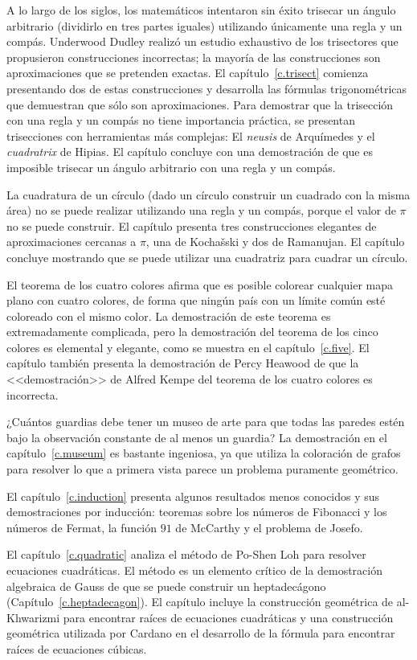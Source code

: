 A lo largo de los siglos, los matemáticos intentaron sin éxito trisecar un ángulo arbitrario (dividirlo en tres partes iguales) utilizando únicamente una regla y un compás. Underwood Dudley realizó un estudio exhaustivo de los trisectores que propusieron construcciones incorrectas; la mayoría de las construcciones son aproximaciones que se pretenden exactas. El capítulo~\ref{c.trisect} comienza presentando dos de estas construcciones y desarrolla las fórmulas trigonométricas que demuestran que sólo son aproximaciones. Para demostrar que la trisección con una regla y un compás no tiene importancia práctica, se presentan trisecciones con herramientas más complejas: El \emph{neusis} de Arquímedes y el \emph{cuadratrix} de Hipias. El capítulo concluye con una demostración de que es imposible trisecar un ángulo arbitrario con una regla y un compás. 

La cuadratura de un círculo (dado un círculo construir un cuadrado con la misma área) no se puede realizar utilizando una regla y un compás, porque el valor de $\pi$ no se puede construir. El capítulo presenta tres construcciones elegantes de aproximaciones cercanas a $\pi$, una de Kochašski y dos de Ramanujan. El capítulo concluye mostrando que se puede utilizar una cuadratriz para cuadrar un círculo.

El teorema de los cuatro colores afirma que es posible colorear cualquier mapa plano con cuatro colores, de forma que ningún país con un límite común esté coloreado con el mismo color. La demostración de este teorema es extremadamente complicada, pero la demostración del teorema de los cinco colores es elemental y elegante, como se muestra en el capítulo~\ref{c.five}. El capítulo también presenta la demostración de Percy Heawood de que la <<demostración>> de Alfred Kempe del teorema de los cuatro colores es incorrecta.

¿Cuántos guardias debe tener un museo de arte para que todas las paredes estén bajo la observación constante de al menos un guardia? La demostración en el capítulo~\ref{c.museum} es bastante ingeniosa, ya que utiliza la coloración de grafos para resolver lo que a primera vista parece un problema puramente geométrico.

El capítulo~\ref{c.induction} presenta algunos resultados menos conocidos y sus demostraciones por inducción: teoremas sobre los números de Fibonacci y los números de Fermat, la función $91$ de McCarthy y el problema de Josefo.

El capítulo~\ref{c.quadratic} analiza el método de Po-Shen Loh para resolver ecuaciones cuadráticas. El método es un elemento crítico de la demostración algebraica de Gauss de que se puede construir un heptadecágono (Capítulo~\ref{c.heptadecagon}). El capítulo incluye la construcción geométrica de al-Khwarizmi para encontrar raíces de ecuaciones cuadráticas y una construcción geométrica utilizada por Cardano en el desarrollo de la fórmula para encontrar raíces de ecuaciones cúbicas.

